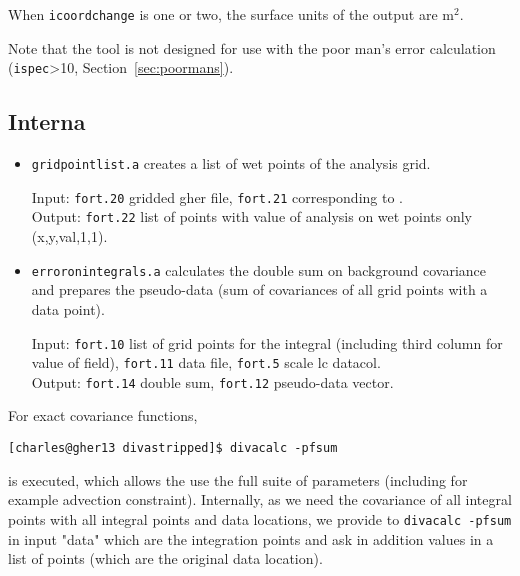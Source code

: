 When {\tt icoordchange} is one or two, the surface units of the output are m$^2$.

Note that the tool is not designed for use with the poor man's error calculation (\texttt{ispec}>10, Section~\ref{sec:poormans}).

\subsection{Interna}

\begin{itemize}

\item \texttt{gridpointlist.a} creates a list of wet points of the analysis grid. 

Input: \texttt{fort.20} gridded gher file, \texttt{fort.21} corresponding to .\\ 
Output: \texttt{fort.22} list of points with value of analysis on wet points only (x,y,val,1,1).

\item \texttt{erroronintegrals.a} calculates the double sum on background covariance and prepares the pseudo-data (sum of covariances of all grid points with a  data point).

Input: \texttt{fort.10} list of grid points for the integral (including third column for value of field), \texttt{fort.11} data file, \texttt{fort.5} scale lc datacol.\\
Output: \texttt{fort.14} double sum, \texttt{fort.12} pseudo-data vector.
\end{itemize}

For exact covariance functions, 

\begin{lstlisting}[style=Bash]
[charles@gher13 divastripped]$ divacalc -pfsum
\end{lstlisting}

is executed, which allows the use the full suite of \diva parameters (including for example advection constraint). Internally, as we need the covariance of all integral points with all integral points and data locations, we provide to {\tt divacalc -pfsum} in input "data" which are the integration points and ask in addition values in a list of points (which are the original data location).

